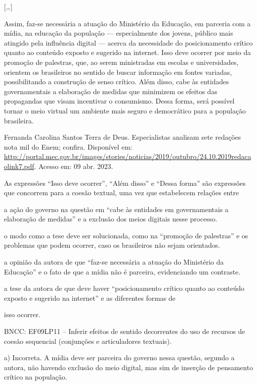 {\begin{itemize}
{[}\ldots{}{]}

Assim, faz-se necessária a atuação do Ministério da Educação, em
parceria com a mídia, na educação da população --- especialmente dos
jovens, público mais atingido pela influência digital --- acerca da
necessidade do posicionamento crítico quanto ao conteúdo exposto e
sugerido na internet. Isso deve ocorrer por meio da promoção de
palestras, que, ao serem ministradas em escolas e universidades,
orientem os brasileiros no sentido de buscar informação em fontes
variadas, possibilitando a construção de senso crítico. Além disso, cabe
às entidades governamentais a elaboração de medidas que minimizem os
efeitos das propagandas que visam incentivar o consumismo. Dessa forma,
será possível tornar o meio virtual um ambiente mais seguro e
democrático para a população brasileira.

Fernanda Carolina Santos Terra de Deus. Especialistas analisam sete
redações nota mil do Enem; confira. Disponível em:
\url{http://portal.mec.gov.br/images/stories/noticias/2019/outubro/24.10.2019redacaolink7.pdf}.
Acesso em: 09 abr. 2023.

As expressões ``Isso deve ocorrer'', ``Além disso'' e ``Dessa forma''
são expressões que concorrem para a coesão textual, uma vez que
estabelecem relações entre

\begin{escolha}
\item a ação do governo na questão em ``cabe às entidades em
governamentais a elaboração de medidas'' e a exclusão dos meios digitais
nesse processo.

\item o modo como a tese deve ser solucionada, como na ``promoção de
palestras'' e os problemas que podem ocorrer, caso os brasileiros não
sejam orientados.

\item a opinião da autora de que ``faz-se necessária a atuação do
Ministério da Educação'' e o fato de que a mídia não é parceira,
evidenciando um contraste.

\item a tese da autora de que deve haver ``posicionamento crítico quanto
ao conteúdo exposto e sugerido na internet'' e as diferentes formas de
\end{escolha}isso ocorrer.


BNCC: EF09LP11 -- Inferir efeitos de sentido decorrentes do uso de
recursos de coesão sequencial (conjunções e articuladores textuais).

a) Incorreta. A mídia deve ser parceira do governo nessa questão,
segundo a autora, não havendo exclusão do meio digital, mas sim de
inserção de pensamento crítico na população.


\end{itemize}}
